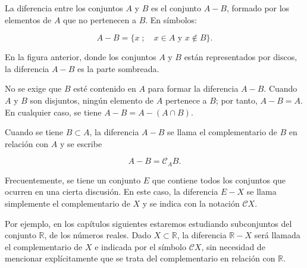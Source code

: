 La diferencia entre los conjuntos \(A\) y \(B\) es el conjunto \(A - B\), formado por los elementos de \(A\) que no pertenecen a \(B\). En símbolos:

\[
A - B = \{x \; ; \quad x \in A \text{ y } x \notin B\}.
\]

\begin{center}
\end{center}

En la figura anterior, donde los conjuntos \(A\) y \(B\) están representados por discos, la diferencia \(A - B\) es la parte sombreada.

No se exige que \(B\) esté contenido en \(A\) para formar la diferencia \(A - B\). Cuando \(A\) y \(B\) son disjuntos, ningún elemento de \(A\) pertenece a \(B\); por tanto, \(A - B = A\). En cualquier caso, se tiene \(A - B = A - (A \cap B)\).

Cuando se tiene \(B \subset A\), la diferencia \(A - B\) se llama el complementario de \(B\) en relación con \(A\) y se escribe

\[
A - B = \mathcal{C}_A B.
\]

Frecuentemente, se tiene un conjunto \(E\) que contiene todos los conjuntos que ocurren en una cierta discusión. En este caso, la diferencia \(E - X\) se llama simplemente el complementario de \(X\) y se indica con la notación \(\mathcal{C}X\).

Por ejemplo, en los capítulos siguientes estaremos estudiando subconjuntos del conjunto \(\mathbb{R}\), de los números reales. Dado \(X \subset \mathbb{R}\), la diferencia \(\mathbb{R} - X\) será llamada el complementario de \(X\) e indicada por el símbolo \(\mathcal{C}X\), sin necesidad de mencionar explícitamente que se trata del complementario en relación con \(\mathbb{R}\).

